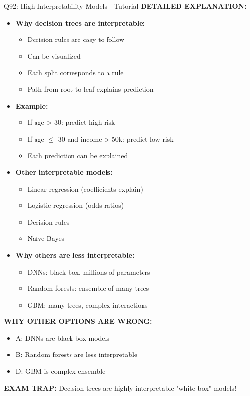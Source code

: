 \documentclass[8pt]{beamer}
\begin{document}
\begin{frame}{Q92: High Interpretability Models - Tutorial}
		\vspace{0.05cm}
		\textbf{DETAILED EXPLANATION:}
		\begin{itemize}
			\item \textbf{Why decision trees are interpretable:}
			\begin{itemize}
				\item Decision rules are easy to follow
				\item Can be visualized
				\item Each split corresponds to a rule
				\item Path from root to leaf explains prediction
			\end{itemize}
			\item \textbf{Example:}
			\begin{itemize}
				\item If age > 30: predict high risk
				\item If age $\leq$ 30 and income > 50k: predict low risk
				\item Each prediction can be explained
			\end{itemize}
			\item \textbf{Other interpretable models:}
			\begin{itemize}
				\item Linear regression (coefficients explain)
				\item Logistic regression (odds ratios)
				\item Decision rules
				\item Naive Bayes
			\end{itemize}
			\item \textbf{Why others are less interpretable:}
			\begin{itemize}
				\item DNNs: black-box, millions of parameters
				\item Random forests: ensemble of many trees
				\item GBM: many trees, complex interactions
			\end{itemize}
		\end{itemize}
		
		\vspace{0.05cm}
		\textcolor{myred}{\textbf{WHY OTHER OPTIONS ARE WRONG:}}
		\begin{itemize}
			\item \textcolor{myred}{A:} DNNs are black-box models
			\item \textcolor{myred}{B:} Random forests are less interpretable
			\item \textcolor{myred}{D:} GBM is complex ensemble
		\end{itemize}
		
		\textcolor{myred}{\textbf{EXAM TRAP:}} Decision trees are highly interpretable "white-box" models!
	\end{frame}
	
\end{document}
